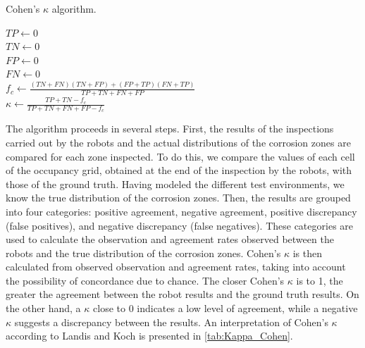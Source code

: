 \begin{algorithm}[h!]
	\caption{Cohen's $\kappa$ algorithm.}
	\label{alg:Cohen_Kappa}
	\KwResult{$\kappa \in [0, 1]$}
	$TP \gets 0$ \\
	$TN \gets 0$ \\
	$FP \gets 0$ \\
	$FN \gets 0$ \\
	$f_c \gets \frac{(TN + FN) (TN + FP) + (FP + TP) (FN + TP)}{TP + TN + FN +FP}$ \\
	$\kappa \gets \frac{TP + TN - f_c}{TP + TN + FN + FP - f_c}$
\end{algorithm}

The algorithm proceeds in several steps.
First, the results of the inspections carried out by the robots and the actual distributions of the corrosion zones are compared for each zone inspected.
To do this, we compare the values of each cell of the occupancy grid, obtained at the end of the inspection by the robots, with those of the ground truth.
Having modeled the different test environments, we know the true distribution of the corrosion zones.
Then, the results are grouped into four categories: positive agreement, negative agreement, positive discrepancy (false positives), and negative discrepancy (false negatives).
These categories are used to calculate the observation and agreement rates observed between the robots and the true distribution of the corrosion zones.
Cohen's $\kappa$ is then calculated from observed observation and agreement rates, taking into account the possibility of concordance due to chance.
The closer Cohen's $\kappa$ is to 1, the greater the agreement between the robot results and the ground truth results.
On the other hand, a $\kappa$ close to 0 indicates a low level of agreement, while a negative $\kappa$ suggests a discrepancy between the results.
An interpretation of Cohen's $\kappa$ according to Landis and Koch is presented in \ref{tab:Kappa_Cohen}.

